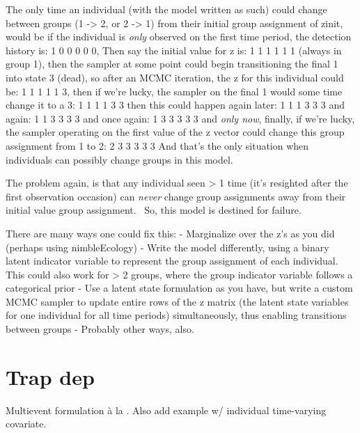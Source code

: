 \documentclass[
  12pt,
]{krantz}
\renewenvironment{quote}{\begin{VF}}{\end{VF}}
\begin{document}
\begin{quote}
The only time an individual (with the model written as such) could change between groups (1 -\textgreater{} 2, or 2 -\textgreater{} 1) from their initial group assignment of zinit, would be if the individual is \emph{only} observed on the first time period, the detection history is:
1 0 0 0 0 0,
Then say the initial value for z is:
1 1 1 1 1 1 (always in group 1),
then the sampler at some point could begin transitioning the final 1 into state 3 (dead), so after an MCMC iteration, the z for this individual could be:
1 1 1 1 1 3,
then if we're lucky, the sampler on the final 1 would some time change it to a 3:
1 1 1 1 3 3
then this could happen again later:
1 1 1 3 3 3
and again:
1 1 3 3 3 3
and once again:
1 3 3 3 3 3
and \emph{only now}, finally, if we're lucky, the sampler operating on the first value of the z vector could change this group assignment from 1 to 2:
2 3 3 3 3 3
And that's the only situation when individuals can possibly change groups in this model.
\end{quote}

\begin{quote}
The problem again, is that any individual seen \textgreater{} 1 time (it's resighted after the first observation occasion) can \emph{never} change group assignments away from their initial value group assignment.~ So, this model is destined for failure.
\end{quote}

\begin{quote}
There are many ways one could fix this:
- Marginalize over the z's as you did (perhaps using nimbleEcology)
- Write the model differently, using a binary latent indicator variable to represent the group assignment of each individual.~ This could also work for \textgreater{} 2 groups, where the group indicator variable follows a categorical prior
- Use a latent state formulation as you have, but write a custom MCMC sampler to update entire rows of the z matrix (the latent state variables for one individual for all time periods) simultaneously, thus enabling transitions between groups
- Probably other ways, also.
\end{quote}

\section{Trap dep}\label{trapdep}

Multievent formulation à la \citet{pradeltrapdep2012}. Also add example w/ individual time-varying covariate.
\end{document}
